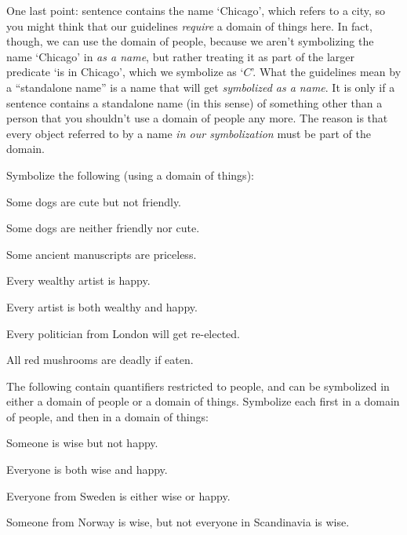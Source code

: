 One last point: sentence  contains the name `Chicago', which refers to a city, so you might think that our guidelines \emph{require} a domain of things here.  In fact, though, we can use the domain of people, because we aren't symbolizing the name `Chicago' in  \emph{as a name}, but rather treating it as part of the larger predicate `\blank is in Chicago', which we symbolize as `$C$'.  What the guidelines mean by a ``standalone name'' is a name that will get \emph{symbolized as a name}.  It is only if a sentence contains a standalone name (in this sense) of something other than a person that you shouldn't use a domain of people any more.  The reason is that every object referred to by a name \emph{in our symbolization} must be part of the domain.

\practiceproblems

\problempart Symbolize the following (using a domain of things): 


\begin{earg}
\item Some dogs are cute but not friendly.

\item Some dogs are neither friendly nor cute.

\item Some ancient manuscripts are priceless.

\item  Every wealthy artist is happy.

\item Every artist is both wealthy and happy.

\item Every politician from London will get re-elected.

\item All red mushrooms are deadly if eaten.
\end{earg}

\problempart  The following contain quantifiers restricted to people, and can be symbolized in either a domain of people or a domain of things.  Symbolize each first in a domain of people, and then in a domain of things:

\begin{earg}
\item Someone is wise but not happy.
\item Everyone is both wise and happy.
\item Everyone from Sweden is either wise or happy.
\item Someone from Norway is wise, but not everyone in Scandinavia is wise.
\end{earg}






